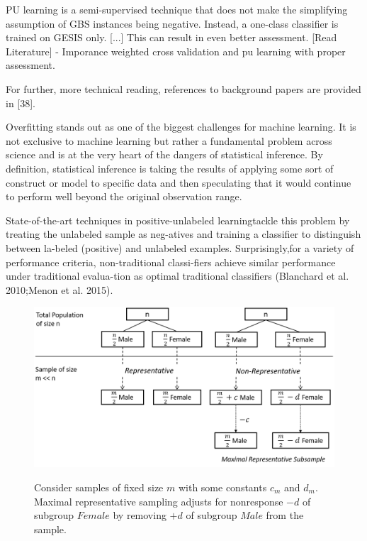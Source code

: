

PU learning is a semi-supervised technique that does not make the simplifying assumption of GBS instances being negative. Instead, a one-class classifier is trained on GESIS only. [...] This can result in even better assessment. [Read Literature] - Imporance weighted cross validation and pu learning with proper assessment.

For further, more technical reading, references to background papers are provided in [38].

Overﬁtting stands out as one of the biggest challenges for machine learning. It is not exclusive to machine learning but rather a fundamental problem across science and is at the very heart of the dangers of statistical inference. By deﬁnition, statistical inference is taking the results of applying some sort of construct or model to speciﬁc data and then speculating that it would continue to perform well beyond the original observation range.

State-of-the-art techniques in positive-unlabeled learningtackle this problem by treating the unlabeled sample as neg-atives and training a classiﬁer to distinguish between la-beled (positive) and unlabeled examples. 
Surprisingly,for a variety of performance criteria, non-traditional classi-ﬁers achieve similar performance under traditional evalua-tion as optimal traditional classiﬁers (Blanchard et al. 2010;Menon et al. 2015). 

\vspace{25pt}
\begin{figure}[ht]
	\begin{center}
		\includegraphics[scale=0.44,angle=0]{fig/Representative}
		\label{representativ}
		\caption{Consider samples of fixed size \(m\) with some constants \(c_m\) and \(d_m\). Maximal representative sampling adjusts for nonresponse \(-d\) of subgroup \(Female\) by removing \(+d\) of subgroup \(Male\) from the sample.}
	\end{center}
\end{figure}

